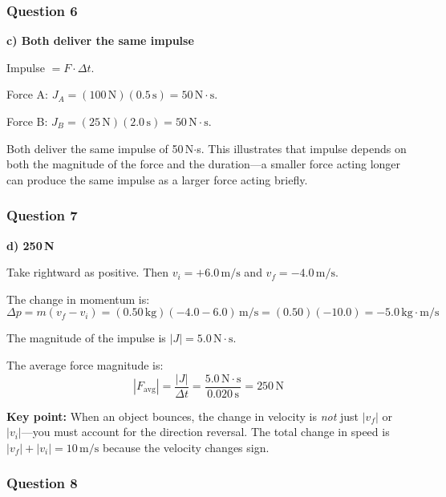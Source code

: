 \documentclass[12pt,letterpaper]{article}
\begin{document}
\subsubsection*{Question 6}

\begin{answerbox}
\textbf{c) Both deliver the same impulse}
\end{answerbox}

\begin{explanationbox}
Impulse $= F \cdot \Delta t$.

Force A: $J_A = (100\,\text{N})(0.5\,\text{s}) = 50\,\text{N}\cdot\text{s}$.

Force B: $J_B = (25\,\text{N})(2.0\,\text{s}) = 50\,\text{N}\cdot\text{s}$.

Both deliver the same impulse of 50\,N$\cdot$s. This illustrates that impulse depends on both the magnitude of the force and the duration---a smaller force acting longer can produce the same impulse as a larger force acting briefly.
\end{explanationbox}

\subsubsection*{Question 7}

\begin{answerbox}
\textbf{d) 250\,N}
\end{answerbox}

\begin{explanationbox}
Take rightward as positive. Then $v_i = +6.0\,\text{m/s}$ and $v_f = -4.0\,\text{m/s}$.

The change in momentum is:
\[
\Delta p = m(v_f - v_i) = (0.50\,\text{kg})(-4.0 - 6.0)\,\text{m/s} = (0.50)(-10.0) = -5.0\,\text{kg}\cdot\text{m/s}
\]

The magnitude of the impulse is $|J| = 5.0\,\text{N}\cdot\text{s}$.

The average force magnitude is:
\[
|F_{\text{avg}}| = \frac{|J|}{\Delta t} = \frac{5.0\,\text{N}\cdot\text{s}}{0.020\,\text{s}} = 250\,\text{N}
\]

\textbf{Key point:} When an object bounces, the change in velocity is \emph{not} just $|v_f|$ or $|v_i|$---you must account for the direction reversal. The total change in speed is $|v_f| + |v_i| = 10\,\text{m/s}$ because the velocity changes sign.
\end{explanationbox}

\subsubsection*{Question 8}
\end{document}
